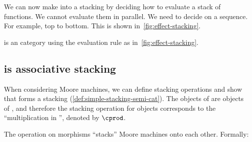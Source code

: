 \begin{marginfigure}
    \centering

    \caption{}
    \label{fig:effect-stacking}
\end{marginfigure}

We can now make \Effects into a stacking  by deciding how to evaluate a stack of functions.
We cannot evaluate them in parallel.
We need to decide on a sequence.
For example, top to bottom.
This is shown in~\cref{fig:effect-stacking}.

\begin{lemma}
    \label{lem:effects-is-stacking}
    \Effects is an   category using the evaluation rule as in~\cref{fig:effect-stacking}.
\end{lemma}


\subsection{\Moore is associative stacking}
When considering Moore machines, we can define stacking operations and show that \Moore forms a stacking  (\cref{def:simple-stacking-semi-cat}).
The objects of \Moore are objects of \SetL, and therefore the stacking operation for objects corresponds to the ``multiplication in \SetL'', denoted by $\cprod$.

The operation on morphisms ``stacks'' Moore machines onto each other.
Formally:

